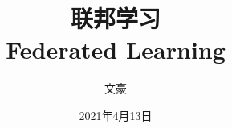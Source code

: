 
\title[FL]{\huge{联邦学习}  \\
\medskip
\small{Federated Learning}
} %

\author[文豪]{文豪} %



\date{\footnotesize 2021年4月13日} %

\setlength{\belowdisplayskip}{5pt} \setlength{\belowdisplayshortskip}{5pt}
\setlength{\abovedisplayskip}{5pt} \setlength{\abovedisplayshortskip}{5pt}


\begin{frame}
\titlepage %
\end{frame}


\begin{frame}
\tableofcontents %
\end{frame}

